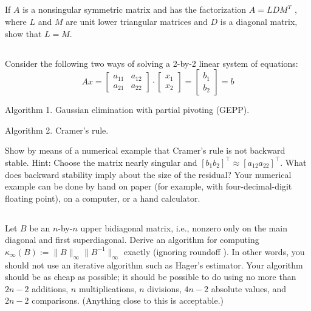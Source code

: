 \documentclass[a4paper]{ctexart}
\newcommand{\pf}{\textbf{\color{pink}{proof:}}}
\begin{document}
\pf

\subsection{}
If $A$ is a nonsingular symmetric matrix and
has the factorization $A = LDM^T$ , where $L$ and $M$ are unit lower triangular
matrices and $D$ is a diagonal matrix, show that $L = M$.

\pf

\subsection{}
Consider the following two ways of solving a 2-by-2
linear system of equations:
\begin{equation*}
    Ax =  \left[
    \begin{matrix}
    a_{11} & a_{12} \\
    a_{21} & a_{22} 
    \end{matrix} \right]
    \cdot \left[
    \begin{matrix}
        x_{1} \\
        x_{2} 
    \end{matrix} \right]
    = \left[
    \begin{matrix}
        b_{1} \\
        b_{2} 
    \end{matrix} \right]
    = b
\end{equation*} 

Algorithm 1. Gaussian elimination with partial pivoting (GEPP).

Algorithm 2. Cramer's rule.

Show by means of a numerical example that Cramer's rule is not backward
stable. Hint: Choose the matrix nearly singular and $[b_1 b_2]^\top \approx [a_{12} a_{22}]^\top$.
What does backward stability imply about the size of the residual? Your
numerical example can be done by hand on paper 
(for example, with four-decimal-digit floating point), 
on a computer, or a hand calculator.

\pf

\subsection{}
Let $B$ be an $n$-by-$n$ upper bidiagonal matrix, i.e.,
nonzero only on the main diagonal and first superdiagonal. Derive an algorithm
for computing $\kappa_{\infty}(B) := \|B\|_{\infty} \|B^{-1}\|_{\infty}$
exactly (ignoring roundoff ). In other
words, you should not use an iterative algorithm such as Hager's estimator.
Your algorithm should be as cheap as possible; it should be possible to do using
no more than $2n - 2$ additions, $n$ multiplications, $n$ divisions, $4n - 2$ absolute
values, and $2n - 2$ comparisons. (Anything close to this is acceptable.) 
\end{document}
